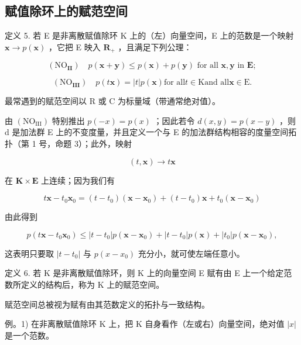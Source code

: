 \subsection{赋值除环上的赋范空间}

定义 5. 若 E 是非离散赋值除环 K 上的（左）向量空间，E 上的范数是一个映射 \(\mathbf{x} \to p(\mathbf{x})\) ，它把 E 映入 \(\mathbf{R}_+\) ，且满足下列公理：

\[
\left(\mathrm{NO} _ {\mathbf {I I}}\right) \quad p (\boldsymbol {x} + \boldsymbol {y}) \leqslant p (\boldsymbol {x}) + p (\boldsymbol {y}) \text {   for   all   } \boldsymbol {x}, \boldsymbol {y} \text {   in   } \mathbf {E};
\]

\[
\left(\mathrm{NO} _ {\mathbf {I I I}}\right) \quad p (t \boldsymbol {x}) = | t | p (\boldsymbol {x}) \text {for all} t \in \mathrm{K} \text {and all} \boldsymbol {x} \in \mathrm{E}.
\]

最常遇到的赋范空间以 R 或 C 为标量域（带通常绝对值）。

由 \((\mathrm{NO}_{\mathrm{III}})\) 特别推出 \(p(-x)=p(x)\) ；因此若令 \(d(x,y)=p(x-y)\) ，则 d 是加法群 E 上的不变度量，并且定义一个与 E 的加法群结构相容的度量空间拓扑（第 1 号，命题 3）；此外，映射

\[
(t, \boldsymbol {x}) \rightarrow t \boldsymbol {x}
\]

在 \(\mathbf{K} \times \mathbf{E}\) 上连续；因为我们有

\[
t \boldsymbol {x} - t _ {0} \boldsymbol {x} _ {0} = (t - t _ {0}) (\boldsymbol {x} - \boldsymbol {x} _ {0}) + (t - t _ {0}) \boldsymbol {x} + t _ {0} (\boldsymbol {x} - \boldsymbol {x} _ {0})
\]

由此得到

\[
p (t \boldsymbol {x} - t _ {0} \boldsymbol {x} _ {0}) \leqslant | t - t _ {0} | p (\boldsymbol {x} - \boldsymbol {x} _ {0}) + | t - t _ {0} | p (\boldsymbol {x}) + | t _ {0} | p (\boldsymbol {x} - \boldsymbol {x} _ {0}),
\]

这表明只要取 \(|t - t_{0}|\) 与 \(p(x - x_{0})\) 充分小，就可使左端任意小。

定义 6. 若 K 是非离散赋值除环，则 K 上的向量空间 E 赋有由 E 上一个给定范数所定义的结构后，称为 K 上的赋范空间。

赋范空间总被视为赋有由其范数定义的拓扑与一致结构。

例。1) 在非离散赋值除环 K 上，把 K 自身看作（左或右）向量空间，绝对值 \(|x|\) 是一个范数。

